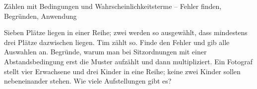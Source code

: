 \begin{aufgabe}{Zählen mit Bedingungen und Wahrscheinlichkeitsterme – Fehler finden, Begründen, Anwendung}
\begin{teile}
\teil Sieben Plätze liegen in einer Reihe; zwei werden so ausgewählt, dass mindestens drei Plätze dazwischen liegen. Tim zählt so. Finde den Fehler und gib alle Auswahlen an. 
\teil Begründe, warum man bei Sitzordnungen mit einer Abstandsbedingung erst die Muster aufzählt und dann multipliziert.
\teil Ein Fotograf stellt vier Erwachsene und drei Kinder in eine Reihe; keine zwei Kinder sollen nebeneinander stehen. Wie viele Aufstellungen gibt es? \leerfeld
\end{teile}
\end{aufgabe}
